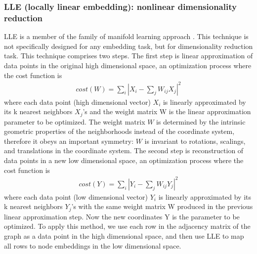 \documentclass{article} %
\begin{document}
\subsubsection{LLE (locally linear embedding): nonlinear dimensionality reduction}
LLE is a member of the family of manifold learning approach \citep{roweis2000nonlinear}.
This technique is not specifically designed for any embedding task, but for dimensionality reduction task.
This technique comprises two steps.
The first step is linear approximation of data points in the original high dimensional space, an optimization process where the cost function is
\begin{align*}
	cost(W) = \sum_i |X_i - \sum_jW_{ij}X_j|^2
\end{align*}
where each data point (high dimensional vector) $ X_i $ is linearly approximated by its k nearest neighbors $ X_j $'s and the weight matrix W is the linear approximation parameter to be optimized.
The weight matrix $ W $ is determined by the intrinsic geometric properties of the neighborhoods instead of the coordinate system, therefore it obeys an important symmetry: $ W $ is invariant to rotations, scalings, and translations in the coordinate system.
The second step is reconstruction of data points in a new low dimensional space, an optimization process where the cost function is
\begin{align*}
	cost(Y) = \sum_i |Y_i - \sum_jW_{ij}Y_j|^2
\end{align*}
where each data point (low dimensional vector) $ Y_i $ is linearly approximated by its k nearest neighbors $ Y_j $'s with the same weight matrix W produced in the previous linear approximation step. Now the new coordinates Y is the parameter to be optimized.
To apply this method, we use each row in the adjacency matrix of the graph as a data point in the high dimensional space, and then use LLE to map all rows to node embeddings in the low dimensional space.
\end{document}
